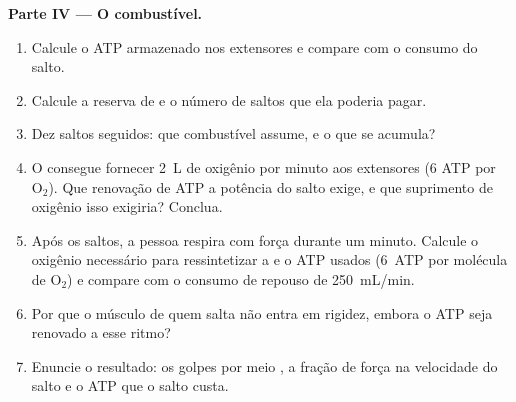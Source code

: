\begin{problem}
\medskip
\noindent\textbf{Parte IV --- O combustível.}
\begin{enumerate}[resume]
  \item Calcule o ATP armazenado nos extensores e compare com o consumo
        do salto.
  \item Calcule a reserva de  e o número de saltos que ela
        poderia pagar.
  \item Dez saltos seguidos: que combustível assume, e o que se acumula?
  \item O  consegue fornecer \qty{2}{L} de oxigênio por minuto aos
        extensores (6 ATP por $\mathrm{O_2}$). Que renovação de ATP a
        potência do salto exige, e que suprimento de oxigênio isso
        exigiria? Conclua.
  \item Após os saltos, a pessoa respira com força durante um minuto.
        Calcule o oxigênio necessário para ressintetizar a 
        e o ATP usados (\qty{6}{ATP} por molécula de $\mathrm{O_2}$) e
        compare com o consumo de repouso de \qty{250}{mL/min}.
  \item Por que o músculo de quem salta não entra em rigidez, embora o
        ATP seja renovado a esse ritmo?
  \item Enuncie o resultado: os golpes por meio , a fração de
        força na velocidade do salto e o ATP que o salto custa.
\end{enumerate}
\end{problem}
